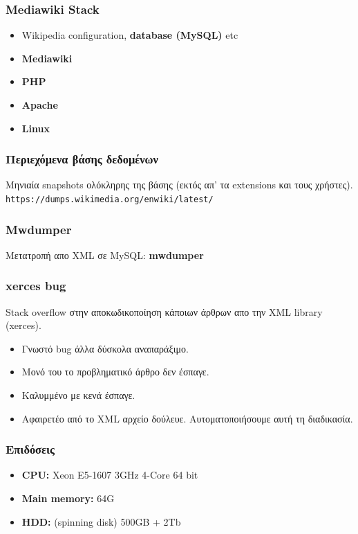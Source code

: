 \documentclass[bigger]{beamer}
\begin{document}
\begin{frame}
  \frametitle{Mediawiki Stack}

  \begin{itemize}
  \item Wikipedia configuration, \textbf<2>{database (MySQL)} etc
  \item \textbf<2>{Mediawiki}
  \item \textbf<2>{PHP}
  \item \textbf<2>{Apache}
  \item \textbf<2>{Linux}
  \end{itemize}
  \vfill
  \vfill
\end{frame}

\begin{frame}
  \frametitle{Περιεχόμενα βάσης δεδομένων}

  Μηνιαία snapshots ολόκληρης της βάσης (εκτός απ' τα extensions και
  τους χρήστες).
  \vfill
  \texttt{https://dumps.wikimedia.org/enwiki/latest/} \vfill
\end{frame}

\begin{frame}
  \frametitle{Mwdumper}

  Μετατροπή απο XML σε MySQL: \bf{mwdumper}
\end{frame}

\begin{frame}
  \frametitle{xerces bug} Stack overflow στην αποκωδικοποίηση κάποιων
  άρθρων απο την XML library (xerces).
  \vfill
  \begin{itemize}
  \item<2-> Γνωστό bug άλλα δύσκολα αναπαράξιμο.
  \item<3-> Μονό του το προβληματικό άρθρο δεν έσπαγε.
  \item<4-> Καλυμμένο με κενά έσπαγε.
  \item<5-> Αφαιρετέο από το XML αρχείο δούλευε.
    Αυτοματοποιήσουμε αυτή τη διαδικασία.
  \end{itemize}
\end{frame}


\begin{frame}
  \frametitle{Επιδόσεις}
  \begin{itemize}
  \item \textbf{CPU:} Xeon E5-1607 3GHz 4-Core 64 bit
  \item \textbf{Main memory:} 64G
  \item \textbf{HDD:} (spinning disk) 500GB + 2Tb
  \end{itemize}
\end{frame}
\end{document}
